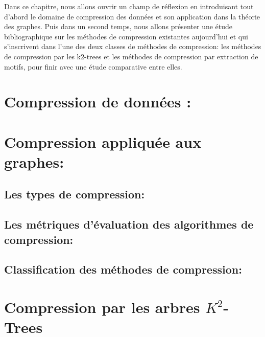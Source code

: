 \documentclass[a4paper,oneside,12pt]{report}
\theoremstyle{definition}
\begin{document}
		 Dans ce chapitre, nous allons
ouvrir un champ de réflexion en introduisant tout d’abord le domaine de compression des données et son application dans la théorie des graphes. Puis dans un second
temps, nous allons présenter une étude bibliographique sur les méthodes de compression existantes aujourd’hui et qui s'inscrivent dans l'une des deux classes de méthodes de compression: les méthodes de compression par les k2-trees et les méthodes de compression par extraction de motifs, pour finir avec une étude comparative entre elles.
	
		
		\section{Compression de données :}
		
			
		
		\section{Compression appliquée aux graphes:}
			
			
	
			\subsection{Les types de compression:}
			
			
	
			\subsection{Les métriques d'évaluation des algorithmes de compression:}
				
			
			\subsection{Classification des méthodes de compression:}
				
				
			\section{Compression par les arbres $K^2$-Trees}
				
				
\end{document}
